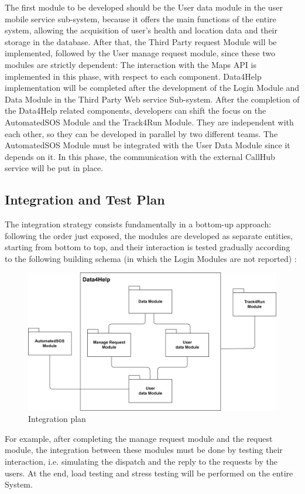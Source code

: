 \vspace{4mm}
The first module to be developed should be the User data module in the user mobile service sub-system, because it offers the main functions of the entire system, allowing the acquisition of user's health and location data and their storage in the database.
After that, the Third Party request Module will be implemented, followed by the User manage request module, since these two modules are strictly dependent:
The interaction with the Maps API is implemented in this phase, with respect to each component.
Data4Help implementation will be completed after the development of the Login Module and Data Module in the Third Party Web service Sub-system.
After the completion of the Data4Help related components, developers can shift the focus on the AutomatedSOS Module and the Track4Run Module. They are independent with each other, so they can be developed in parallel by two different teams.
The AutomatedSOS Module must be integrated with the User Data Module since it depends on it. In this phase, the communication with the external CallHub service will be put in place. 


\subsection{Integration and Test Plan}
The integration strategy consists fundamentally in a bottom-up approach: following the order just exposed, the modules are developed as separate entities, starting from bottom to top, and their interaction is tested gradually according to the following building schema (in which the Login Modules are not reported) :

\begin{figure}[H]
\includegraphics[scale=0.1,keepaspectratio]{DD/Pictures/integration.png}
\centering
\caption{Integration plan}
\end{figure}
 
For example, after completing the manage request module and the request module, the integration between these modules must be done by testing their interaction, i.e. simulating the dispatch and the reply to the requests by the users. 
At the end, load testing and stress testing will be performed on the entire System.

